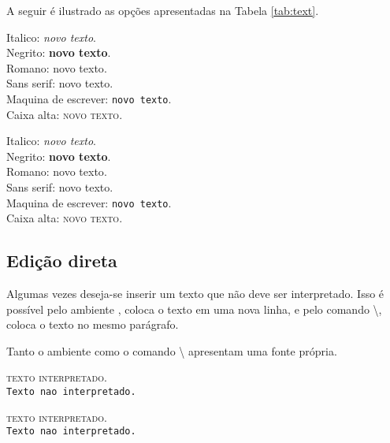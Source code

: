 A seguir é ilustrado as opções apresentadas na Tabela \ref{tab:text}. \\
\begin{minipage}[t]{0.47\linewidth} \vspace{-8pt}
    \begin{latexcode}
        Italico: \textit{novo texto}. \\
        Negrito: \textbf{novo texto}. \\
        Romano: \textrm{novo texto}. \\
        Sans serif: \textsf{novo texto}. \\
        Maquina de escrever: \texttt{novo texto}. \\
        Caixa alta: \textsc{novo texto}.
    \end{latexcode}
\end{minipage} \hfill
\begin{minipage}[t]{0.47\linewidth} \vspace{0pt}
    Italico: \textit{novo texto}. \\
    Negrito: \textbf{novo texto}. \\
    Romano: \textrm{novo texto}. \\
    Sans serif: \textsf{novo texto}. \\
    Maquina de escrever: \texttt{novo texto}. \\
    Caixa alta: \textsc{novo texto}.
\end{minipage}

\subsection{Edição direta}
Algumas vezes deseja-se inserir um texto que não deve ser interpretado. Isso é possível pelo ambiente , coloca o texto em uma nova linha, e pelo comando \textbackslash{}, coloca o texto no mesmo parágrafo.

Tanto o ambiente  como o comando \textbackslash{} apresentam uma fonte própria. \\
\begin{minipage}[t]{0.47\linewidth} \vspace{-8pt}
    \begin{latexcode}
        \textsc{texto interpretado.} \\
        \verb+Texto nao interpretado.+
    \end{latexcode}
\end{minipage} \hfill
\begin{minipage}[t]{0.47\linewidth} \vspace{0pt}
    \textsc{texto interpretado.} \\
    \verb+Texto nao interpretado.+
\end{minipage}

